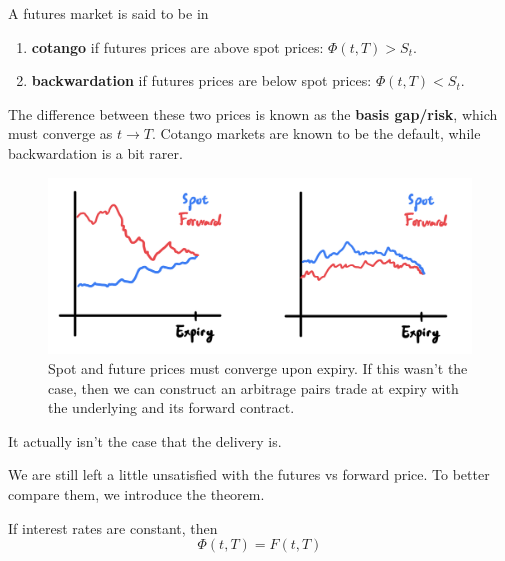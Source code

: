 \documentclass{article}
\begin{document}
    \begin{definition}
      A futures market is said to be in 
      \begin{enumerate}
        \item \textbf{cotango} if futures prices are above spot prices: $\Phi(t, T) > S_t$. 
        \item \textbf{backwardation} if futures prices are below spot prices: $\Phi(t, T) < S_t$. 
      \end{enumerate}
      The difference between these two prices is known as the \textbf{basis gap/risk}, which must converge as $t \rightarrow T$.  Cotango markets are known to be the default, while backwardation is a bit rarer. 
      \begin{figure}[H]
        \centering 
        \includegraphics[scale=0.5]{img/cotango_backwardation.png}
        \caption{Spot and future prices must converge upon expiry. If this wasn't the case, then we can construct an arbitrage pairs trade at expiry with the underlying and its forward contract. } 
        \label{fig:cotango_backwardation}
      \end{figure}
    \end{definition}

    \begin{example}
      It actually isn't the case that the delivery is. 
    \end{example}

    We are still left a little unsatisfied with the futures vs forward price.  To better compare them, we introduce the theorem. 

    \begin{theorem}
      If interest rates are constant, then 
      \begin{equation}
        \Phi (t, T) = F(t, T)
      \end{equation}
    \end{theorem}
\end{document}
